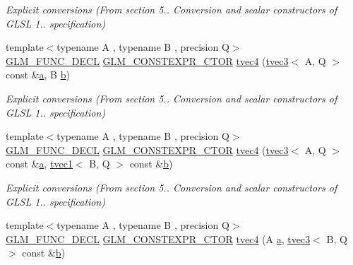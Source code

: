 \begin{DoxyCompactItemize}
\begin{DoxyCompactList}\small\item\em Explicit conversions (From section 5.. Conversion and scalar constructors of G\+L\+SL 1.. specification) \end{DoxyCompactList}\item 
{\footnotesize template$<$typename A , typename B , precision Q$>$ }\\\mbox{\hyperlink{setup_8hpp_ab2d052de21a70539923e9bcbf6e83a51}{G\+L\+M\+\_\+\+F\+U\+N\+C\+\_\+\+D\+E\+CL}} \mbox{\hyperlink{setup_8hpp_ad34178a09666081abdb573c14d1f4a5a}{G\+L\+M\+\_\+\+C\+O\+N\+S\+T\+E\+X\+P\+R\+\_\+\+C\+T\+OR}} \mbox{\hyperlink{structglm_1_1tvec4_abf6fb7c4a9dcaba61d1a898c86ed4a3b}{tvec4}} (\mbox{\hyperlink{structglm_1_1tvec3}{tvec3}}$<$ A, Q $>$ const \&\mbox{\hyperlink{glad_8h_ac8729153468b5dcf13f971b21d84d4e5}{a}}, B \mbox{\hyperlink{glad_8h_a6eba317e3cf44d6d26c04a5a8f197dcb}{b}})
\begin{DoxyCompactList}\small\item\em Explicit conversions (From section 5.. Conversion and scalar constructors of G\+L\+SL 1.. specification) \end{DoxyCompactList}\item 
{\footnotesize template$<$typename A , typename B , precision Q$>$ }\\\mbox{\hyperlink{setup_8hpp_ab2d052de21a70539923e9bcbf6e83a51}{G\+L\+M\+\_\+\+F\+U\+N\+C\+\_\+\+D\+E\+CL}} \mbox{\hyperlink{setup_8hpp_ad34178a09666081abdb573c14d1f4a5a}{G\+L\+M\+\_\+\+C\+O\+N\+S\+T\+E\+X\+P\+R\+\_\+\+C\+T\+OR}} \mbox{\hyperlink{structglm_1_1tvec4_aff338bbba3d73d36cda06a09a676d934}{tvec4}} (\mbox{\hyperlink{structglm_1_1tvec3}{tvec3}}$<$ A, Q $>$ const \&\mbox{\hyperlink{glad_8h_ac8729153468b5dcf13f971b21d84d4e5}{a}}, \mbox{\hyperlink{structglm_1_1tvec1}{tvec1}}$<$ B, Q $>$ const \&\mbox{\hyperlink{glad_8h_a6eba317e3cf44d6d26c04a5a8f197dcb}{b}})
\begin{DoxyCompactList}\small\item\em Explicit conversions (From section 5.. Conversion and scalar constructors of G\+L\+SL 1.. specification) \end{DoxyCompactList}\item 
{\footnotesize template$<$typename A , typename B , precision Q$>$ }\\\mbox{\hyperlink{setup_8hpp_ab2d052de21a70539923e9bcbf6e83a51}{G\+L\+M\+\_\+\+F\+U\+N\+C\+\_\+\+D\+E\+CL}} \mbox{\hyperlink{setup_8hpp_ad34178a09666081abdb573c14d1f4a5a}{G\+L\+M\+\_\+\+C\+O\+N\+S\+T\+E\+X\+P\+R\+\_\+\+C\+T\+OR}} \mbox{\hyperlink{structglm_1_1tvec4_a20fd8534260d3d1a5e8e5b70831bd4f6}{tvec4}} (A \mbox{\hyperlink{glad_8h_ac8729153468b5dcf13f971b21d84d4e5}{a}}, \mbox{\hyperlink{structglm_1_1tvec3}{tvec3}}$<$ B, Q $>$ const \&\mbox{\hyperlink{glad_8h_a6eba317e3cf44d6d26c04a5a8f197dcb}{b}})

\end{DoxyCompactItemize}
